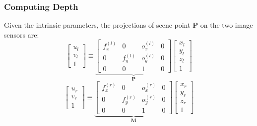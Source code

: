 \begin{frame}
    \frametitle{Computing Depth}
    Given the intrinsic parameters, the projections of scene point $\mathbf{P}$ on the two image sensors are:
    \begin{equation*}
        \begin{bmatrix} u_l \\ v_l \\ 1 \end{bmatrix}
        \equiv
        \underbrace{\begin{bmatrix}
            f_x^{(l)} & 0 & o_x^{(l)} & 0 \\
            0 & f_y^{(l)} & o_y^{(l)} & 0 \\
            0 & 0 & 1 & 0
        \end{bmatrix}}_{\mathbf{P}}
        \begin{bmatrix} x_l \\ y_l \\ z_l \\ 1 \end{bmatrix}
    \end{equation*}
    \begin{equation*}
        \begin{bmatrix} u_r \\ v_r \\ 1 \end{bmatrix}
        \equiv
        \underbrace{\begin{bmatrix}
            f_x^{(r)} & 0 & o_x^{(r)} & 0 \\
            0 & f_y^{(r)} & o_y^{(r)} & 0 \\
            0 & 0 & 1 & 0
        \end{bmatrix}}_{\mathbf{M}}
        \begin{bmatrix} x_r \\ y_r \\ z_r \\ 1 \end{bmatrix}
    \end{equation*}
\end{frame}

